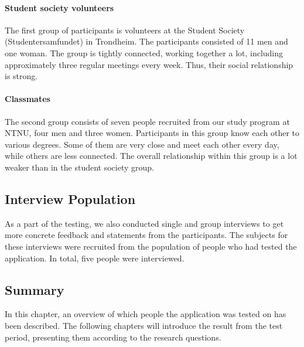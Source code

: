\paragraph*{Student society volunteers}
The first group of participants is volunteers at the Student Society (Studentersamfundet) in Trondheim. The participants consisted of 11 men and one woman. The group is tightly connected, working together a lot, including approximately three regular meetings every week. Thus, their social relationship is strong.

\paragraph*{Classmates}
The second group consists of seven people recruited from our study program at NTNU, four men and three women. Participants in this group know each other to various degrees. Some of them are very close and meet each other every day, while others are less connected. The overall relationship within this group is a lot weaker than in the student society group.

\subsection{Interview Population}
As a part of the testing, we also conducted single and group interviews to get more concrete feedback and statements from the participants. The subjects for these interviews were recruited from the population of people who had tested the application. In total, five people were interviewed.

\subsection{Summary}
In this chapter, an overview of which people the application was tested on has been described. The following chapters will introduce the result from the test period, presenting them according to the research questions.